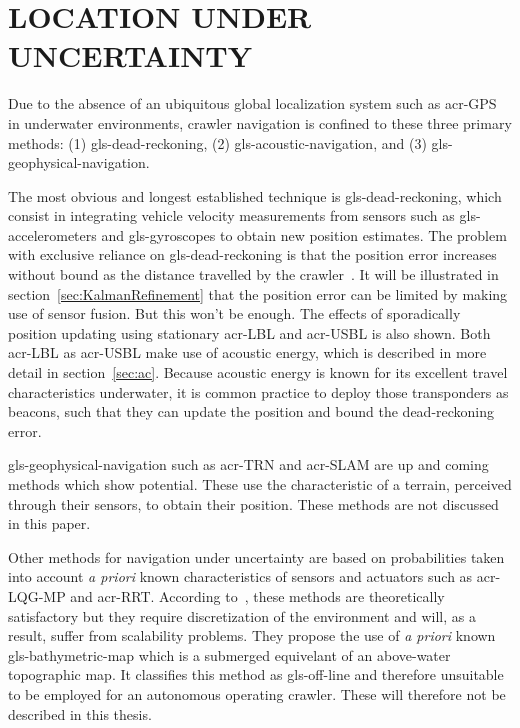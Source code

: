 

\section{LOCATION UNDER UNCERTAINTY}\label{sec:coverageunderuncertainty}

Due to the absence of an ubiquitous global localization system such as \gls{acr-GPS} in underwater environments, crawler
navigation is confined to these three primary methods: (1) \gls{gls-dead-reckoning}, (2) \gls{gls-acoustic-navigation},
and (3) \gls{gls-geophysical-navigation}.

The most obvious and longest established technique is \gls{gls-dead-reckoning}, which consist in integrating vehicle 
velocity measurements from sensors such as \glspl{gls-accelerometer} and \glspl{gls-gyroscope} to obtain new position
estimates. The problem with exclusive reliance on \gls{gls-dead-reckoning} is that the position error increases 
without bound as the distance travelled by the crawler~\cite{galceran_coverage_2014}. It will be illustrated in 
section~\ref{sec:KalmanRefinement} that the position error can be limited by making use of sensor fusion. But this 
won't be enough. The effects of sporadically position updating using stationary \gls{acr-LBL} and \gls{acr-USBL} is 
also shown. Both \gls{acr-LBL} as \gls{acr-USBL} make use of acoustic energy, which is described in more detail in 
section~\ref{sec:ac}. Because acoustic energy is known for its excellent travel characteristics underwater, it is 
common practice to deploy those transponders as beacons, such that they can update the position and bound the 
dead-reckoning error.

\Gls{gls-geophysical-navigation} such as \gls{acr-TRN} and \gls{acr-SLAM} are up and coming methods which
show potential. These use the characteristic of a terrain, perceived through their sensors, to obtain their position.
These methods are not discussed in this paper.

Other methods for navigation under uncertainty are based on probabilities taken into account \emph{a priori} known 
characteristics of sensors and actuators such as \gls{acr-LQG-MP} and \gls{acr-RRT}. According 
to~\citet{galceran_uncertainty_driven_2013}, these methods are theoretically satisfactory but they require 
discretization of the environment and will, as a result, suffer from scalability problems. They propose the use of 
\emph{a priori} known \gls{gls-bathymetric-map} which is a submerged equivelant of an above-water topographic map. It
classifies this method as \gls{gls-off-line} and therefore unsuitable to be employed for an autonomous operating 
crawler. These will therefore not be described in this thesis.

